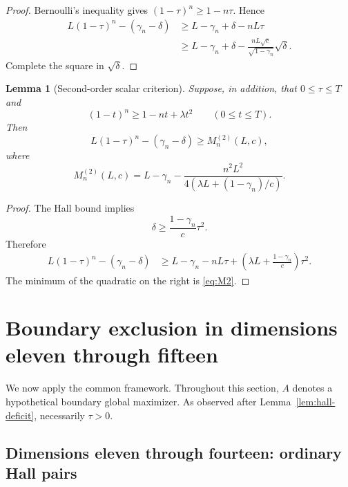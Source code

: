 \documentclass[11pt,a4paper]{article}
\numberwithin{equation}{section}
\newtheorem{lemma}[theorem]{Lemma}
\theoremstyle{definition}
\newcommand{\1}{\mathbf{1}}
\begin{document}
\begin{proof}
Bernoulli's inequality gives $(1-\tau)^n\ge1-n\tau$.  Hence
\[
 \begin{aligned}
 L(1-\tau)^n-(\gamma_n-\delta)
 &\ge L-\gamma_n+\delta-nL\tau\\
 &\ge L-\gamma_n+\delta
 -\frac{nL\sqrt c}{\sqrt{1-\gamma_n}}\sqrt\delta.
 \end{aligned}
\]
Complete the square in $\sqrt\delta$.
\end{proof}

\begin{lemma}[Second-order scalar criterion]\label{lem:second-order}
Suppose, in addition, that $0\le\tau\le T$ and
\begin{equation}\label{eq:quadratic-binomial}
 (1-t)^n\ge1-nt+\lambda t^2
 \qquad(0\le t\le T).
\end{equation}
Then
\begin{equation}\label{eq:second-margin}
 L(1-\tau)^n-(\gamma_n-\delta)
 \ge
 M_n^{(2)}(L,c),
\end{equation}
where
\begin{equation}\label{eq:M2}
 M_n^{(2)}(L,c)
 =L-\gamma_n-
 \frac{n^2L^2}
 {4\left(\lambda L+(1-\gamma_n)/c\right)}.
\end{equation}
\end{lemma}

\begin{proof}
The Hall bound implies
\[
 \delta\ge\frac{1-\gamma_n}{c}\tau^2.
\]
Therefore
\[
 \begin{aligned}
 L(1-\tau)^n-(\gamma_n-\delta)
 &\ge L-\gamma_n-nL\tau
 +\left(\lambda L+\frac{1-\gamma_n}{c}\right)\tau^2.
 \end{aligned}
\]
The minimum of the quadratic on the right is \eqref{eq:M2}.
\end{proof}

\section{Boundary exclusion in dimensions eleven through fifteen}\label{sec:mid-high}

We now apply the common framework.  Throughout this section, $A$ denotes a hypothetical boundary global maximizer.  As observed after Lemma~\ref{lem:hall-deficit}, necessarily $\tau>0$.

\subsection{Dimensions eleven through fourteen: ordinary Hall pairs}
\end{document}
